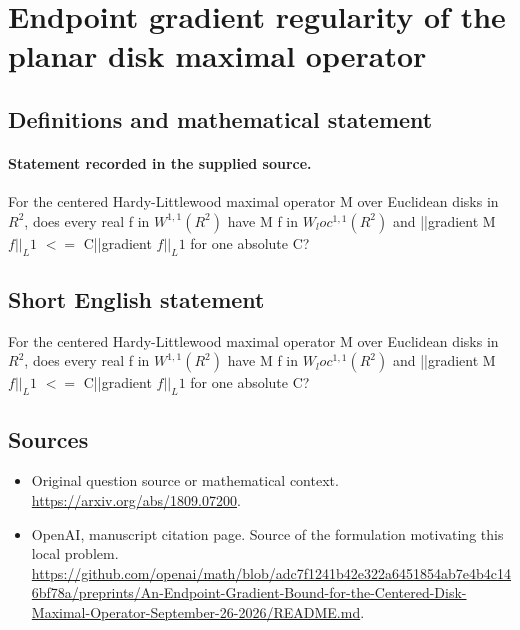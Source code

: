 \documentclass[11pt]{article}
\begin{document}
\section*{Endpoint gradient regularity of the planar disk maximal operator}\label{statement}
\subsection{Definitions and mathematical statement}
\paragraph{Statement recorded in the supplied source.}
For the centered Hardy-Littlewood maximal operator M over Euclidean disks in $R^2$, does every real f in $W^{1,1}(R^2)$ have M f in $W_loc^{1,1}(R^2)$ and ||gradient M $f||_L1$ $<=$ C||gradient $f||_L1$ for one absolute C?
\subsection{Short English statement}
For the centered Hardy-Littlewood maximal operator M over Euclidean disks in $R^2$, does every real f in $W^{1,1}(R^2)$ have M f in $W_loc^{1,1}(R^2)$ and ||gradient M $f||_L1$ $<=$ C||gradient $f||_L1$ for one absolute C?
\subsection{Sources}
\begin{itemize}
\item[S1] Original question source or mathematical context.
\url{https://arxiv.org/abs/1809.07200}.
\item[S2] OpenAI, manuscript citation page. Source of the formulation motivating this local problem.
\url{https://github.com/openai/math/blob/adc7f1241b42e322a6451854ab7e4b4c146bf78a/preprints/An-Endpoint-Gradient-Bound-for-the-Centered-Disk-Maximal-Operator-September-26-2026/README.md}.
\end{itemize}
\end{document}
